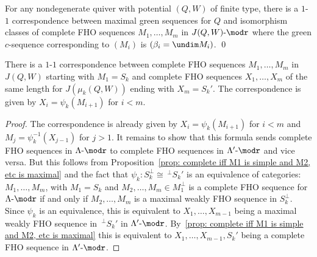 
\begin{coro}\label{cor: main thm of section 2}
For any nondegenerate quiver with potential $(Q,W)$ of finite type, there is a $1$-$1$ correspondence between maximal green sequences for $Q$ and isomorphism classes of complete FHO sequences $M_1,\ldots,M_m$ in $J(Q,W)\text{-}\modr $ where the green $c$-sequence corresponding to $(M_i)$ is $(\beta_i=\undim M_i)$. \qed
\end{coro}

\begin{coro}\label{cor: rotation lemma}
There is a $1$-$1$ correspondence between complete FHO sequences $M_1,\ldots,M_m$ in $J(Q,W)$ starting with $M_1=S_k$ and complete FHO sequences $X_1,\ldots,X_m$ of the same length for $J(\mu_k(Q,W))$ ending with $X_m=S_k'$. The correspondence is given by $X_i=\psi_k(M_{i+1})$ for $i<m$.
\end{coro}

\begin{proof} The correspondence is already given by $X_i=\psi_k(M_{i+1})$ for $i<m$ and $M_j=\psi_k^{-1}(X_{j-1})$ for $j>1$. It remains to show that this formula sends complete FHO sequences in $\Lambda\text{-}\modr $ to complete FHO sequences in $\Lambda'\text{-}\modr $ and vice versa. But this follows from Proposition~\ref{prop: complete iff M1 is simple and M2, etc is maximal} and the fact that $\psi_k:S_k^\perp\cong \,^\perp S_k'$ is an equivalence of categories: $M_1,\ldots,M_m$, with $M_1=S_k$ and $M_2,\ldots,M_m\in M_1^\perp$ is a complete FHO sequence for $\Lambda\text{-}\modr $ if and only if $M_2,\ldots,M_m$ is a maximal weakly FHO sequence in $S_k^\perp$. Since $\psi_k$ is an equivalence, this is equivalent to $X_1,\ldots,X_{m-1}$ being a maximal weakly FHO sequence in $\,^\perp S_k'$ in $\Lambda'\text{-}\modr $. By~\ref{prop: complete iff M1 is simple and M2, etc is maximal} this is equivalent to $X_1,\ldots,X_{m-1},S_k'$ being a complete FHO sequence in $\Lambda'\text{-}\modr $.
\end{proof}

